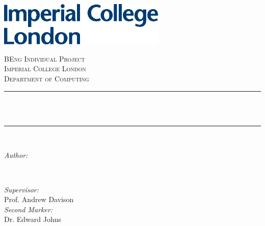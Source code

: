 \begin{titlepage}

\newcommand{\HRule}{\rule{\linewidth}{0.5mm}}


\includegraphics[width=8cm]{title/logo.eps}\\[1cm] %
 

\center %


\textsc{\LARGE BEng Individual Project}\\[1.5cm]
\textsc{\Large Imperial College London}\\[0.5cm]
\textsc{\large Department of Computing}\\[0.5cm]

\makeatletter
\HRule \\[0.4cm]
{ \huge \bfseries \@title}\\[0.4cm] %
\HRule \\[1.5cm]
 

\begin{minipage}{0.4\textwidth}
\begin{flushleft} \large
\emph{Author:}\\
\@author %
\end{flushleft}
\end{minipage}
~
\begin{minipage}{0.4\textwidth}
\begin{flushright} \large
\emph{Supervisor:} \\
Prof. Andrew Davison \\[1.2em]
\emph{Second Marker:} \\
Dr. Edward Johns \\[1.2em]
\end{flushright}
\end{minipage}\\[2cm]
\makeatother


\end{titlepage}
